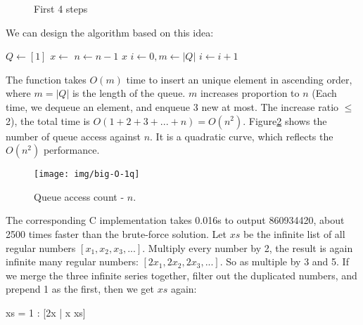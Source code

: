 \documentclass[b5paper]{article}
\begin{document}
\begin{figure}[htbp]
  \centering
  \caption{First 4 steps}
  \label{fig:queues}
\end{figure}

We can design the algorithm based on this idea:

\begin{algorithmic}[1]
  \State $Q \gets [1]$
    \State $x \gets$ 
    \State {}
    \State {}
    \State {}
    \State $n \gets n-1$
  \EndWhile
  \State \Return $x$
\EndFunction
\Statex
{}
  \State $i \gets 0, m \gets |Q|$
    \State $i \gets i + 1$
  \EndWhile
    \State {}
  \EndIf
\EndFunction
\end{algorithmic}

The  function takes $O(m)$ time to insert an unique element in ascending order, where $m = |Q|$ is the length of the queue. $m$ increases proportion to $n$ (Each time, we dequeue an element, and enqueue 3 new at most. The increase ratio $\leq$ 2), the total time is $O(1 + 2 + 3 + ... + n) = O(n^2)$. Figure\cref{fig:big-O-1q} shows the number of queue access against $n$. It is a quadratic curve, which reflects the $O(n^2)$ performance.

\begin{figure}[htbp]
  \centering
  \texttt{[image: img/big-O-1q]}
  \caption{Queue access count - $n$.}
  \label{fig:big-O-1q}
\end{figure}

The corresponding C implementation takes 0.016s to output 860934420, about 2500 times faster than the brute-force solution. Let $xs$ be the infinite list of all regular numbers $[x_1, x_2, x_3, ...]$. Multiply every number by 2, the result is again infinite many regular numbers: $[2x_1, 2x_2, 2x_3, ...]$. So as multiple by 3 and 5. If we merge the three infinite series together, filter out the duplicated numbers, and prepend 1 as the first, then we get $xs$ again:

\be
  xs = 1 : [2x | x \gets xs] \cup [3x | x \gets xs] \cup [5x | x \gets xs]
\ee
\end{document}

